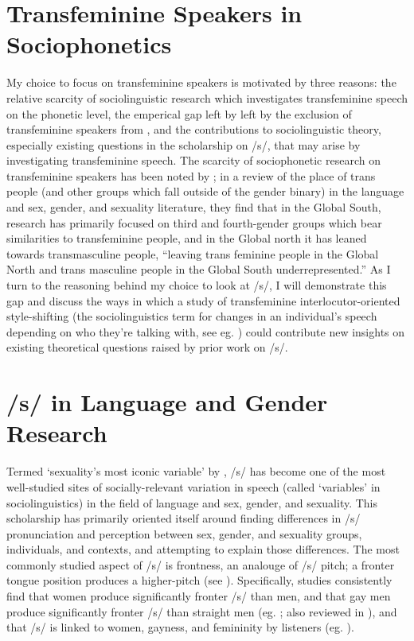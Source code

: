 \section{Transfeminine Speakers in Sociophonetics}
My choice to focus on transfeminine speakers is motivated by three reasons: the relative scarcity of sociolinguistic research which investigates transfeminine speech on the phonetic level, the emperical gap left by left by the exclusion of transfeminine speakers from \textcite{parnell-mooney_transgender_2019}, and the contributions to sociolinguistic theory, especially existing questions in the scholarship on /s/, that may arise by investigating transfeminine speech.  The scarcity of sociophonetic research on transfeminine speakers has been noted by \textcite{zimman_transgender_2020}; in a review of the place of trans people (and other groups which fall outside of the gender binary) in the language and sex, gender, and sexuality literature, they find that  in the Global South, research has primarily focused on third and fourth-gender groups  which bear similarities to transfeminine people, and in the Global north it has leaned towards transmasculine people, ``leaving trans feminine people in the Global North and trans masculine people in the Global South underrepresented.'' As I turn to the reasoning behind my choice to look at /s/, I will demonstrate this gap and discuss the ways in which a study of transfeminine interlocutor-oriented style-shifting (the sociolinguistics term for changes in an individual's speech depending on who they're talking with, see eg. \cite{rickford_addressee_1994}) could contribute new insights on existing theoretical questions raised by prior work on /s/.

\section{/s/ in Language and Gender Research}

Termed `sexuality's most iconic variable' by \textcite{calder_gay_2020}, /s/ has become one of the most well-studied sites of socially-relevant variation in speech (called `variables' in sociolinguistics) in the field of language and sex, gender, and sexuality. This scholarship has primarily oriented itself around finding differences in /s/ pronunciation and perception between sex, gender, and sexuality groups, individuals, and contexts, and attempting to explain those differences. The most commonly studied aspect of /s/ is frontness, an analouge of /s/ pitch; a fronter tongue position produces a higher-pitch (see \cite{fuchs_differences_2010}). Specifically, studies consistently find that women produce significantly fronter /s/ than men, and that gay men produce significantly fronter /s/ than straight men (eg. \cite{podesva_sexuality_2015, hazenberg_language_2012, flipsen_acoustic_1999}; also reviewed in \cite{calder_gay_2020}), and that /s/ is linked to women, gayness, and femininity by listeners (eg. \cite{campbell-kibler_intersecting_2011, maegaard_s_2015}).




